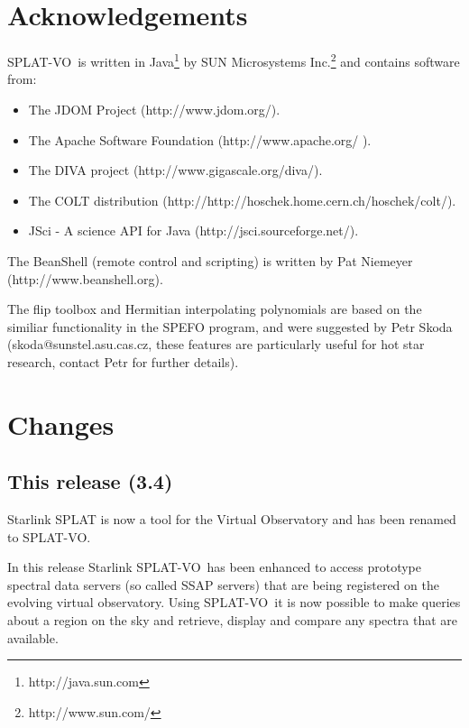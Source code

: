 \documentclass[twoside,11pt]{article}
\newcommand{\htmladdnormallinkfoot}[2]{#1\footnote{#2}}
\newcommand{\htmladdnormallink}[2]{#1}
\renewcommand{\_}{\texttt{\symbol{95}}}
\newcommand{\SPLAT}{\textsf{SPLAT-VO}}
\begin{document}
\section{Acknowledgements}

\SPLAT\ is written in
\htmladdnormallinkfoot{Java}{http://java.sun.com} by
\htmladdnormallinkfoot{SUN Microsystems Inc.}{http://www.sun.com/} and
contains software from:
\begin{itemize}
\item The JDOM Project (\htmladdnormallink{http://www.jdom.org/}
                        {http://www.jdom.org/}).
\item The Apache Software Foundation
      (\htmladdnormallink{http://www.apache.org/}{http://www.apache.org/} ).
\item The DIVA project
      (\htmladdnormallink{http://www.gigascale.org/diva/}
                         {http://www.gigascale.org/diva/}).
\item The COLT distribution
      (\htmladdnormallink{http://http://hoschek.home.cern.ch/hoschek/colt/}
                         {http://http://hoschek.home.cern.ch/hoschek/colt/}).
\item JSci - A science API for Java
      (\htmladdnormallink{http://jsci.sourceforge.net/}
                         {http://jsci.sourceforge.net/}).
\end{itemize}

The BeanShell (remote control and scripting) is written by Pat
Niemeyer (\htmladdnormallink{http://www.beanshell.org}
                            {http://www.beanshell.org}).

The flip toolbox and Hermitian interpolating polynomials are based on the
similiar functionality in the SPEFO program, and were suggested by Petr Skoda
(skoda@sunstel.asu.cas.cz, these features are particularly useful for hot star
research, contact Petr for further details).

\section{Changes}

\subsection{This release (3.4)}

Starlink SPLAT is now a tool for the Virtual Observatory and has been
renamed to \SPLAT.

In this release Starlink \SPLAT\ has been enhanced to access prototype
spectral data servers (so called SSAP servers) that are being registered on
the evolving virtual observatory. Using \SPLAT\ it is now possible to make
queries about a region on the sky and retrieve, display and compare any
spectra that are available.
\end{document}
